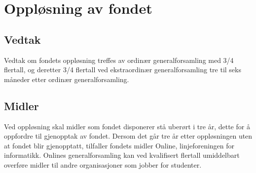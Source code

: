 \chapter{Oppløsning av fondet}

\section{Vedtak}

Vedtak om fondets oppløsning treffes av ordinær generalforsamling med 3/4 flertall, og deretter 3/4 flertall ved ekstraordinær generalforsamling tre til seks måneder etter ordinær generalforsamling.

\section{Midler}

Ved oppløsning skal midler som fondet disponerer stå uberørt i tre år, dette for å oppfordre til gjenopptak av fondet. Dersom det går tre år etter oppløsningen uten at fondet blir gjenopptatt, tilfaller fondets midler Online, linjeforeningen for informatikk. Onlines generalforsamling kan ved kvalifisert flertall umiddelbart overføre midler til andre organisasjoner som jobber for studenter.

